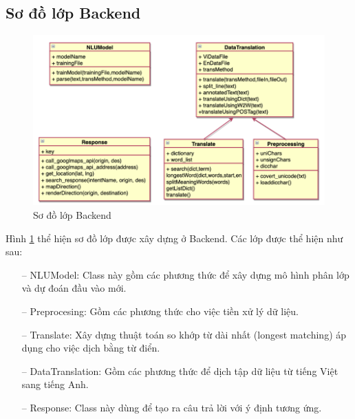 \subsection{Sơ đồ lớp Backend}
\begin{figure}[H]
    \centering
    \includegraphics[width=15cm]{images/serverclassdiagram.png}
    \caption{Sơ đồ lớp Backend}
    \label{fig:serverclassdiagram} 
\end{figure}

Hình \ref{fig:serverclassdiagram} thể hiện sơ đồ lớp được xây dựng ở Backend. Các lớp được thể hiện như sau:

\begin{itemize}
    \item[--] NLUModel: Class này gồm các phương thức để xây dựng mô hình phân lớp và dự đoán đầu vào mới.
    \item[--] Preprocesing: Gồm các phương thức cho việc tiền xử lý dữ liệu.
    \item[--] Translate: Xây dựng thuật toán so khớp từ dài nhất (longest matching) áp dụng cho việc dịch bằng từ điển.
    \item[--] DataTranslation: Gồm các phương thức để dịch tập dữ liệu từ tiếng Việt sang tiếng Anh.
    \item[--] Response: Class này dùng để tạo ra câu trả lời với ý định tương ứng.
    
\end{itemize}


